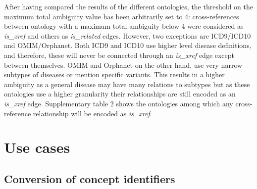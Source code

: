 \documentclass[9pt,a4paper,]{extarticle}
\begin{document}
After having compared the results of the different ontologies, the threshold on the maximum total ambiguity value has been arbitrarily set to 4: cross-references between ontology with a maximum total ambiguity below 4 were considered as \emph{is\_xref} and others as \emph{is\_related} edges. However, two exceptions are ICD9/ICD10 and OMIM/Orphanet. Both ICD9 and ICD10 use higher level disease definitions, and therefore, these will never be connected through an \emph{is\_xref} edge except between themselves. OMIM and Orphanet on the other hand, use very narrow subtypes of diseases or mention specific variants. This results in a higher ambiguity as a general disease may have many relations to subtypes but as these ontologies use a higher granularity their relationships are still encoded as an \emph{is\_xref} edge. Supplementary table 2 shows the ontologies among which any cross-reference relationship will be encoded as \emph{is\_xref}.

\hypertarget{use-cases}{%
\section{Use cases}\label{use-cases}}

\hypertarget{conversion-of-concept-identifiers}{%
\subsection{Conversion of concept identifiers}\label{conversion-of-concept-identifiers}}
\end{document}
